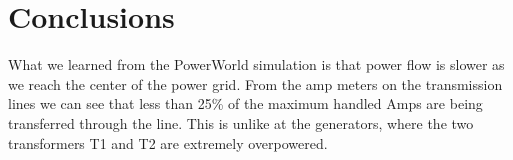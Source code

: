 \documentclass[12pt]{article}
\begin{document}

        
        
        \newpage

        \section{Conclusions}
        \newpage
		\indent\par{What we learned from the PowerWorld simulation is that power flow is slower as we reach the center of the power grid. From the amp meters on the transmission lines we can see that less than 25\% of the maximum handled Amps are being transferred through the line. This is unlike at the generators, where the two transformers T1 and T2 are extremely overpowered.}

    
\end{document}
